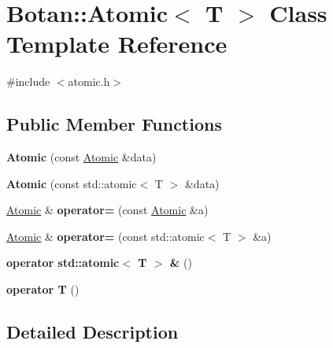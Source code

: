 \hypertarget{class_botan_1_1_atomic}{}\section{Botan\+:\+:Atomic$<$ T $>$ Class Template Reference}
\label{class_botan_1_1_atomic}


{\ttfamily \#include $<$atomic.\+h$>$}

\subsection*{Public Member Functions}
\begin{DoxyCompactItemize}
\item 
\mbox{\label{class_botan_1_1_atomic_aff0c0127720365839815fcbf96c36893}} 
{\bfseries Atomic} (const \mbox{\hyperlink{class_botan_1_1_atomic}{Atomic}} \&data)
\item 
\mbox{\label{class_botan_1_1_atomic_ab0dd01bcbc20804ca1b3607e7495c2a2}} 
{\bfseries Atomic} (const std\+::atomic$<$ T $>$ \&data)
\item 
\mbox{\label{class_botan_1_1_atomic_a162ef567d1d8aa2a32956290d8a572e2}} 
\mbox{\hyperlink{class_botan_1_1_atomic}{Atomic}} \& {\bfseries operator=} (const \mbox{\hyperlink{class_botan_1_1_atomic}{Atomic}} \&a)
\item 
\mbox{\label{class_botan_1_1_atomic_ab161a076ffec827889fcbd8f23c29a1c}} 
\mbox{\hyperlink{class_botan_1_1_atomic}{Atomic}} \& {\bfseries operator=} (const std\+::atomic$<$ T $>$ \&a)
\item 
\mbox{\label{class_botan_1_1_atomic_ae11b6b3622de4e46946d1b46620dae29}} 
{\bfseries operator std\+::atomic$<$ T $>$ \&} ()
\item 
\mbox{\label{class_botan_1_1_atomic_aad990a5bf5e43a29bc3120c7a6a3bbc6}} 
{\bfseries operator T} ()
\end{DoxyCompactItemize}


\subsection{Detailed Description}
